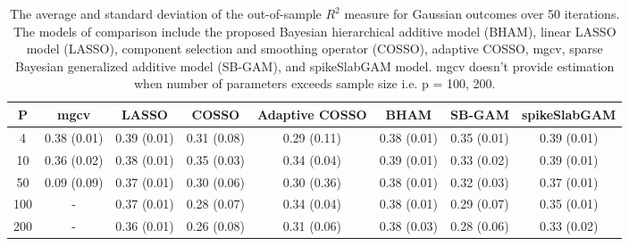 \begin{table}[ht]
\centering
\begin{tabular}{cccccccc}
  \hline
P & mgcv & LASSO & COSSO & Adaptive COSSO & BHAM & SB-GAM & spikeSlabGAM \\ 
  \hline
  4 & 0.38 (0.01) & 0.39 (0.01) & 0.31 (0.08) & 0.29 (0.11) & 0.38 (0.01) & 0.35 (0.01) & 0.39 (0.01) \\ 
   10 & 0.36 (0.02) & 0.38 (0.01) & 0.35 (0.03) & 0.34 (0.04) & 0.39 (0.01) & 0.33 (0.02) & 0.39 (0.01) \\ 
   50 & 0.09 (0.09) & 0.37 (0.01) & 0.30 (0.06) & 0.30 (0.36) & 0.38 (0.01) & 0.32 (0.03) & 0.37 (0.01) \\ 
  100 & - & 0.37 (0.01) & 0.28 (0.07) & 0.34 (0.04) & 0.38 (0.01) & 0.29 (0.07) & 0.35 (0.01) \\ 
  200 & - & 0.36 (0.01) & 0.26 (0.08) & 0.31 (0.06) & 0.38 (0.03) & 0.28 (0.06) & 0.33 (0.02) \\ 
   \hline
\end{tabular}
\caption{The average and standard deviation of the out-of-sample $R^2$ measure for
    Gaussian outcomes over 50 iterations. The models of comparison include the proposed
    Bayesian hierarchical additive model (BHAM), linear LASSO model (LASSO), component
    selection and smoothing operator (COSSO), adaptive COSSO, mgcv, sparse Bayesian
    generalized additive model (SB-GAM), and spikeSlabGAM model. mgcv doesn't provide estimation
    when number of parameters exceeds sample size i.e. p = 100, 200.} 
\label{tab:lnr_gaus}
\end{table}
